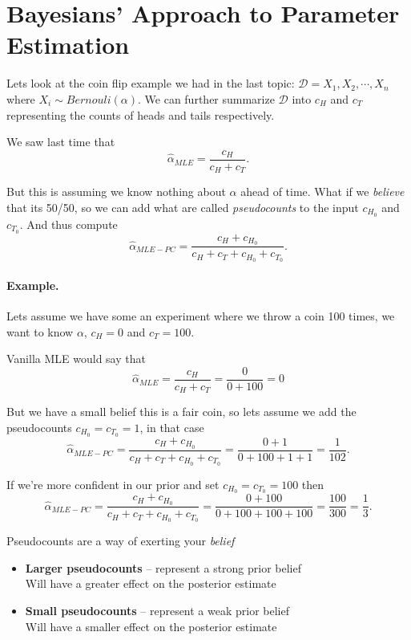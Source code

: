 \section{Bayesians' Approach to Parameter Estimation}
Lets look at the coin flip example we had in the last topic: 
 $\mathcal{D} = X_1, X_2, \cdots, X_n$ 
where $X_i \sim Bernouli(\alpha)$.
We can further summarize $\mathcal{D}$ into $c_H$ and $c_T$ 
representing the counts of heads and tails respectively. 

We saw last time that \[\hat\alpha_{MLE} = \frac{c_H}{c_H+c_T}.\]

But this is assuming we know nothing about $\alpha$ ahead of time. 
What if we \textit{believe} that its 50/50, so we can add what are called \emph{pseudocounts}
to the input $c_{H_0}$ and $c_{T_0}$.
And thus compute 
\[\hat\alpha_{MLE-PC} = \frac{c_H+c_{H_0}}{c_H+c_T+c_{H_0}+c_{T_0}}.\]

\paragraph{Example. }
Lets assume we have some an experiment where we throw a coin 100 times, we want to know $\alpha$, $c_H=0$ and $c_T=100$.

Vanilla MLE would say that 
\[\hat\alpha_{MLE} = \frac{c_H}{c_H+c_T} = \frac{0}{0 + 100} = 0\]
  
But we have a small belief this is a fair coin, so lets assume we add the pseudocounts $c_{H_0}=c_{T_0}=1$, 
in that case 
\[\hat\alpha_{MLE-PC} = \frac{c_H+c_{H_0}}{c_H+c_T+c_{H_0}+c_{T_0}}=\frac{0+1}{0+100+1+1} = \frac{1}{102}.\]

If we're more confident in our prior and set  $c_{H_0}=c_{T_0}=100$ then
\[\hat\alpha_{MLE-PC} = \frac{c_H+c_{H_0}}{c_H+c_T+c_{H_0}+c_{T_0}}=\frac{0+100}{0+100+100+100} = \frac{100}{300} = \frac{1}{3}.\]

Pseudocounts are a way of exerting your \textit{belief}
\begin{itemize}
\item[] \textbf{Larger pseudocounts} – represent a strong prior belief\\\hspace*{3em}
Will have a greater effect on the posterior estimate
\item[] \textbf{Small pseudocounts} – represent a weak prior belief\\\hspace*{3em}
Will have a smaller effect on the posterior estimate
\end{itemize}

